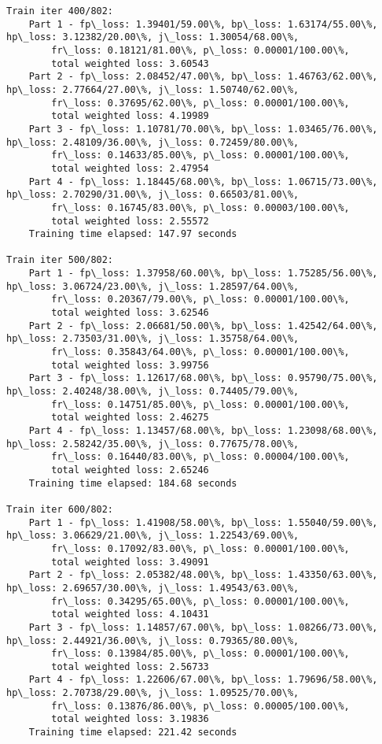 \documentclass[11pt]{article}
\begin{document}
\begin{Verbatim}[commandchars=\\\{\}]
Train iter 400/802:
	Part 1 - fp\_loss: 1.39401/59.00\%, bp\_loss: 1.63174/55.00\%, hp\_loss: 3.12382/20.00\%, j\_loss: 1.30054/68.00\%, 
		fr\_loss: 0.18121/81.00\%, p\_loss: 0.00001/100.00\%, 
		total weighted loss: 3.60543
	Part 2 - fp\_loss: 2.08452/47.00\%, bp\_loss: 1.46763/62.00\%, hp\_loss: 2.77664/27.00\%, j\_loss: 1.50740/62.00\%, 
		fr\_loss: 0.37695/62.00\%, p\_loss: 0.00001/100.00\%, 
		total weighted loss: 4.19989
	Part 3 - fp\_loss: 1.10781/70.00\%, bp\_loss: 1.03465/76.00\%, hp\_loss: 2.48109/36.00\%, j\_loss: 0.72459/80.00\%, 
		fr\_loss: 0.14633/85.00\%, p\_loss: 0.00001/100.00\%, 
		total weighted loss: 2.47954
	Part 4 - fp\_loss: 1.18445/68.00\%, bp\_loss: 1.06715/73.00\%, hp\_loss: 2.70290/31.00\%, j\_loss: 0.66503/81.00\%, 
		fr\_loss: 0.16745/83.00\%, p\_loss: 0.00003/100.00\%, 
		total weighted loss: 2.55572
	Training time elapsed: 147.97 seconds

Train iter 500/802:
	Part 1 - fp\_loss: 1.37958/60.00\%, bp\_loss: 1.75285/56.00\%, hp\_loss: 3.06724/23.00\%, j\_loss: 1.28597/64.00\%, 
		fr\_loss: 0.20367/79.00\%, p\_loss: 0.00001/100.00\%, 
		total weighted loss: 3.62546
	Part 2 - fp\_loss: 2.06681/50.00\%, bp\_loss: 1.42542/64.00\%, hp\_loss: 2.73503/31.00\%, j\_loss: 1.35758/64.00\%, 
		fr\_loss: 0.35843/64.00\%, p\_loss: 0.00001/100.00\%, 
		total weighted loss: 3.99756
	Part 3 - fp\_loss: 1.12617/68.00\%, bp\_loss: 0.95790/75.00\%, hp\_loss: 2.40248/38.00\%, j\_loss: 0.74405/79.00\%, 
		fr\_loss: 0.14751/85.00\%, p\_loss: 0.00001/100.00\%, 
		total weighted loss: 2.46275
	Part 4 - fp\_loss: 1.13457/68.00\%, bp\_loss: 1.23098/68.00\%, hp\_loss: 2.58242/35.00\%, j\_loss: 0.77675/78.00\%, 
		fr\_loss: 0.16440/83.00\%, p\_loss: 0.00004/100.00\%, 
		total weighted loss: 2.65246
	Training time elapsed: 184.68 seconds

Train iter 600/802:
	Part 1 - fp\_loss: 1.41908/58.00\%, bp\_loss: 1.55040/59.00\%, hp\_loss: 3.06629/21.00\%, j\_loss: 1.22543/69.00\%, 
		fr\_loss: 0.17092/83.00\%, p\_loss: 0.00001/100.00\%, 
		total weighted loss: 3.49091
	Part 2 - fp\_loss: 2.05382/48.00\%, bp\_loss: 1.43350/63.00\%, hp\_loss: 2.69657/30.00\%, j\_loss: 1.49543/63.00\%, 
		fr\_loss: 0.34295/65.00\%, p\_loss: 0.00001/100.00\%, 
		total weighted loss: 4.10431
	Part 3 - fp\_loss: 1.14857/67.00\%, bp\_loss: 1.08266/73.00\%, hp\_loss: 2.44921/36.00\%, j\_loss: 0.79365/80.00\%, 
		fr\_loss: 0.13984/85.00\%, p\_loss: 0.00001/100.00\%, 
		total weighted loss: 2.56733
	Part 4 - fp\_loss: 1.22606/67.00\%, bp\_loss: 1.79696/58.00\%, hp\_loss: 2.70738/29.00\%, j\_loss: 1.09525/70.00\%, 
		fr\_loss: 0.13876/86.00\%, p\_loss: 0.00005/100.00\%, 
		total weighted loss: 3.19836
	Training time elapsed: 221.42 seconds


\end{Verbatim}
\end{document}
